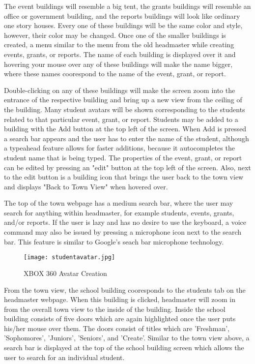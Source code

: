 \documentclass[11pt]{article}
\begin{document}
The event buildings will resemble a big tent, the grants buildings will resemble an office or government building, and the reports buildings will look like ordinary one story houses. Every one of these buildings will be the same color and style, however, their color may be changed. Once one of the smaller buildings is created, a menu similar to the menu from the old headmaster while creating events, grants, or reports. The name of each building is displayed over it and hovering your mouse over any of these buildings will make the name bigger, where these names coorespond to the name of the event, grant, or report.

Double-clicking on any of these buildings will make the screen zoom into the entrance of the respective building and bring up a new view from the ceiling of the building. Many student avatars will be shown corresponding to the students related to that particular event, grant, or report. Students may be added to a building with the Add button at the top left of the screen. When Add is pressed a search bar appears and the user has to enter the name of the student, although a typeahead feature allows for faster additions, because it autocompletes the student name that is being typed. The properties of the event, grant, or report can be edited by pressing an "edit" button at the top left of the screen. Also, next to the edit button is a building icon that brings the user back to the town view and displays "Back to Town View" when hovered over.

 The top of the town webpage has a medium search bar, where the user may search for anything within headmaster, for example students, events, grants, and/or reports. If the user is lazy and has no desire to use the keyboard, a voice command may also be issued by pressing a microphone icon next to the search bar. This feature is similar to Google's seach bar microphone technology. 

\begin{figure}[h]
\centering
\texttt{[image: studentavatar.jpg]}
\caption{XBOX 360 Avatar Creation}
\label{avatar}
\end{figure}

From the town view, the school building cooresponds to the students tab on the headmaster webpage. When this building is clicked, headmaster will zoom in from the overall town view to the inside of the building. Inside the school building consists of five doors which are again highlighted once the user puts his/her mouse over them. The doors consist of titles which are 'Freshman', 'Sophomores', 'Juniors', 'Seniors', and 'Create'. Similar to the town view above, a search bar is displayed at the top of the school building screen which allows the user to search for an individual student.
\end{document}
